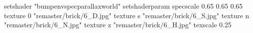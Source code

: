 setshader "bumpenvspecparallaxworld"
setshaderparam specscale 0.65 0.65 0.65
    texture 0 "remaster/brick/6_D.jpg"
    texture s "remaster/brick/6_S.jpg"
    texture n "remaster/brick/6_N.jpg"
    texture z "remaster/brick/6_H.jpg"
    texscale 0.25